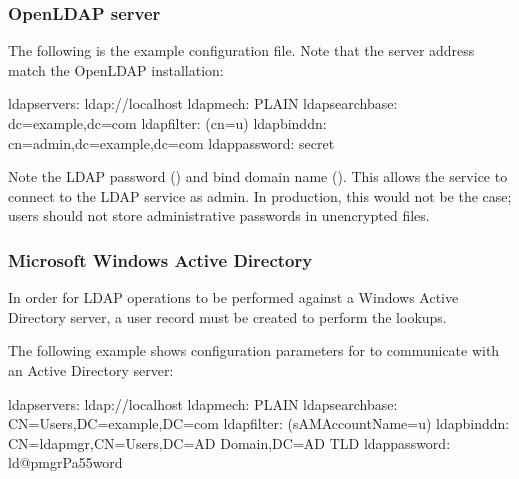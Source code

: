 \documentclass[letterpaper,10pt,english]{sphinxmanual}
\begin{document}
\subsubsection{OpenLDAP server}
\label{\detokenize{sasl-auth:openldap-server}}
\sphinxAtStartPar
The following is the example configuration file. Note that the server address  match the OpenLDAP installation:

\begin{sphinxVerbatim}[commandchars=\\\{\}]
ldap\PYGZus{}servers: ldap://localhost
ldap\PYGZus{}mech: PLAIN
ldap\PYGZus{}search\PYGZus{}base: dc=example,dc=com
ldap\PYGZus{}filter: (cn=\PYGZpc{}u)
ldap\PYGZus{}bind\PYGZus{}dn: cn=admin,dc=example,dc=com
ldap\PYGZus{}password: secret
\end{sphinxVerbatim}

\sphinxAtStartPar
Note the LDAP password () and bind domain name ().
This allows the  service to connect to the LDAP service as admin.
In production, this would not be the case; users should not store administrative passwords in unencrypted files.


\subsubsection{Microsoft Windows Active Directory}
\label{\detokenize{sasl-auth:microsoft-windows-active-directory}}\label{\detokenize{sasl-auth:windows-ad}}
\sphinxAtStartPar
In order for LDAP operations to be performed
against a Windows Active Directory server,
a user record must be created to perform the lookups.

\sphinxAtStartPar
The following example shows configuration parameters for 
to communicate with an Active Directory server:

\begin{sphinxVerbatim}[commandchars=\\\{\}]
ldap\PYGZus{}servers: ldap://localhost
ldap\PYGZus{}mech: PLAIN
ldap\PYGZus{}search\PYGZus{}base: CN=Users,DC=example,DC=com
ldap\PYGZus{}filter: (sAMAccountName=\PYGZpc{}u)
ldap\PYGZus{}bind\PYGZus{}dn: CN=ldapmgr,CN=Users,DC=\PYGZlt{}AD Domain\PYGZgt{},DC=\PYGZlt{}AD TLD\PYGZgt{}
ldap\PYGZus{}password: ld@pmgr\PYGZus{}Pa55word
\end{sphinxVerbatim}
\end{document}
